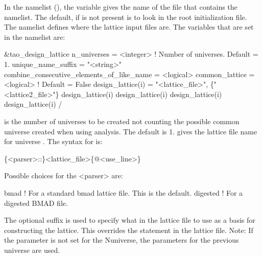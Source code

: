 In the  namelist (), the  variable gives the name
of the file that contains the  namelist. The default, if  is
not present is to look in the \tao root initialization file. The  namelist
defines where the lattice input files are. The variables that are set in the 
namelist are:
\begin{example}
  &tao_design_lattice
    n_universes        = <integer>      ! Number of universes. Default = 1.
    unique_name_suffix = "<string>"
    combine_consecutive_elements_of_like_name = <logical>
    common_lattice = <logical>                        ! Default = False
    design_lattice(i) = "<lattice_file>", \{"<lattice2_file>"\}
    design_lattice(i)%
    design_lattice(i)%
    design_lattice(i)%
    design_lattice(i)%
  /
\end{example}

 is the number of universes to be created not counting the possible common universe
created when using  analysis. The default is 1.   gives the lattice
file name for universe .  The syntax for  is:
\begin{example}
  \{<parser>::\}<lattice_file>\{@<use_line>\}
\end{example}
Possible choices for the <parser> are:
\begin{example}
  bmad      ! For a standard bmad lattice file. This is the default.
  digested  ! For a digested BMAD file.
\end{example}
The  optional suffix is used to specify what  in the lattice file to use as
a basis for constructing the lattice. This overrides the  statement in the lattice file.
Note: If the  parameter is not set for the N\Th universe, the parameters for the 
previous universe are used.

